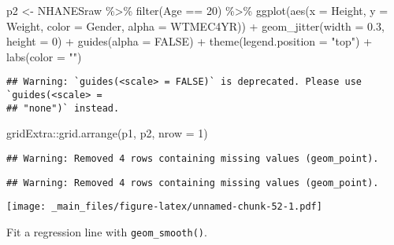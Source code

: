 \documentclass[
]{book}
\newenvironment{Shaded}{\begin{snugshade}}{\end{snugshade}}
\newcommand{\AttributeTok}[1]{\textcolor[rgb]{0.77,0.63,0.00}{#1}}
\newcommand{\ConstantTok}[1]{\textcolor[rgb]{0.00,0.00,0.00}{#1}}
\newcommand{\DecValTok}[1]{\textcolor[rgb]{0.00,0.00,0.81}{#1}}
\newcommand{\FloatTok}[1]{\textcolor[rgb]{0.00,0.00,0.81}{#1}}
\newcommand{\FunctionTok}[1]{\textcolor[rgb]{0.00,0.00,0.00}{#1}}
\newcommand{\NormalTok}[1]{#1}
\newcommand{\OtherTok}[1]{\textcolor[rgb]{0.56,0.35,0.01}{#1}}
\newcommand{\SpecialCharTok}[1]{\textcolor[rgb]{0.00,0.00,0.00}{#1}}
\newcommand{\StringTok}[1]{\textcolor[rgb]{0.31,0.60,0.02}{#1}}
\theoremstyle{definition}
\theoremstyle{definition}
\theoremstyle{definition}
\theoremstyle{definition}
\theoremstyle{remark}
\begin{document}
\begin{Shaded}
\begin{Highlighting}[]
\NormalTok{p2 }\OtherTok{\textless{}{-}}\NormalTok{ NHANESraw }\SpecialCharTok{\%\textgreater{}\%} 
  \FunctionTok{filter}\NormalTok{(Age }\SpecialCharTok{==} \DecValTok{20}\NormalTok{) }\SpecialCharTok{\%\textgreater{}\%}
  \FunctionTok{ggplot}\NormalTok{(}\FunctionTok{aes}\NormalTok{(}\AttributeTok{x =}\NormalTok{ Height, }\AttributeTok{y =}\NormalTok{ Weight, }\AttributeTok{color =}\NormalTok{ Gender, }\AttributeTok{alpha =}\NormalTok{ WTMEC4YR)) }\SpecialCharTok{+}
  \FunctionTok{geom\_jitter}\NormalTok{(}\AttributeTok{width =} \FloatTok{0.3}\NormalTok{, }\AttributeTok{height =} \DecValTok{0}\NormalTok{) }\SpecialCharTok{+}
  \FunctionTok{guides}\NormalTok{(}\AttributeTok{alpha =} \ConstantTok{FALSE}\NormalTok{) }\SpecialCharTok{+}
  \FunctionTok{theme}\NormalTok{(}\AttributeTok{legend.position =} \StringTok{"top"}\NormalTok{) }\SpecialCharTok{+}
  \FunctionTok{labs}\NormalTok{(}\AttributeTok{color =} \StringTok{""}\NormalTok{)}
\end{Highlighting}
\end{Shaded}

\begin{verbatim}
## Warning: `guides(<scale> = FALSE)` is deprecated. Please use `guides(<scale> =
## "none")` instead.
\end{verbatim}

\begin{Shaded}
\begin{Highlighting}[]
\NormalTok{gridExtra}\SpecialCharTok{::}\FunctionTok{grid.arrange}\NormalTok{(p1, p2, }\AttributeTok{nrow =} \DecValTok{1}\NormalTok{)}
\end{Highlighting}
\end{Shaded}

\begin{verbatim}
## Warning: Removed 4 rows containing missing values (geom_point).
\end{verbatim}

\begin{verbatim}
## Warning: Removed 4 rows containing missing values (geom_point).
\end{verbatim}

\texttt{[image: \_main\_files/figure-latex/unnamed-chunk-52-1.pdf]}

Fit a regression line with \texttt{geom\_smooth()}.
\end{document}
